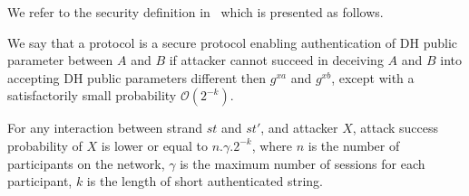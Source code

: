 We refer to the security definition in~\cite{1580514} which is presented as follows. 

\begin{Definition}
We say that a protocol is a secure protocol enabling authentication of DH public parameter between $A$ and $B$ if attacker cannot succeed in deceiving $A$ and $B$ into accepting DH public parameters different then $g^{xa}$ and $g^{xb}$, except with a satisfactorily small probability $\mathcal{O}(2^{-k})$.
\end{Definition}

\begin{Lemma}\label{lemme5.1}

For any interaction between strand $st$ and $st'$, and attacker $X$, attack success probability of $X$ is lower or equal to $n.\gamma.2^{-k}$, 
where $n$ is the number of participants on the network, $\gamma$ is the maximum number of sessions for each participant, $k$ is the length of short authenticated string. 
\end{Lemma}

